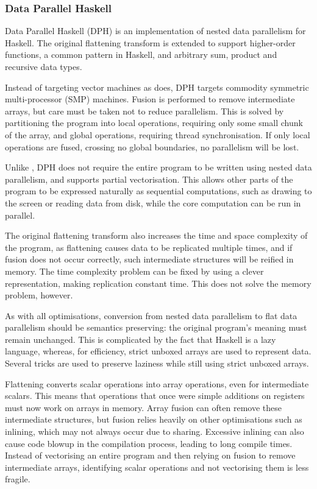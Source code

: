 \subsubsection{Data Parallel Haskell}
Data Parallel Haskell (DPH) is an implementation of nested data parallelism for Haskell\cite{chakravarty2007data}.
The original flattening transform is extended to support higher-order functions\cite{leshchinskiy2006higher}, a common pattern in Haskell,
and arbitrary sum, product and recursive data types\cite{chakravarty2000more}.

Instead of targeting vector machines as \nesl does, DPH targets commodity symmetric multi-processor (SMP) machines.
Fusion is performed to remove intermediate arrays, but care must be taken not to reduce parallelism\cite{chakravarty1999portable}.
This is solved by partitioning the program into local operations, requiring only some small chunk of the array,
and global operations, requiring thread synchronisation\cite{keller1999distributed}.
If only local operations are fused, crossing no global boundaries, no parallelism will be lost.

Unlike \nesl, DPH does not require the entire program to be written using nested data parallelism,
and supports partial vectorisation\cite{chakravarty2008partial}.
This allows other parts of the program to be expressed naturally as sequential computations, such as drawing to the screen or reading data from disk,
while the core computation can be run in parallel.

The original flattening transform also increases the time and space complexity of the program,
as flattening causes data to be replicated multiple times,
and if fusion does not occur correctly, such intermediate structures will be reified in memory.
The time complexity problem can be fixed by using a clever representation, making replication constant time\cite{lippmeier2012work}.
This does not solve the memory problem, however.

As with all optimisations, conversion from nested data parallelism to flat data parallelism should be semantics preserving:
the original program's meaning must remain unchanged\cite{leshchinskiy2005higher}.
This is complicated by the fact that Haskell is a lazy language, whereas, for efficiency, strict unboxed arrays are used to represent data.
Several tricks are used to preserve laziness while still using strict unboxed arrays.

Flattening converts scalar operations into array operations, even for intermediate scalars\cite{keller2012vectorisation}.
This means that operations that once were simple additions on registers must now work on arrays in memory.
Array fusion can often remove these intermediate structures, but fusion relies heavily on other optimisations such as inlining,
which may not always occur due to sharing. Excessive inlining can also cause code blowup in the compilation process,
leading to long compile times.
Instead of vectorising an entire program and then relying on fusion to remove intermediate arrays,
identifying scalar operations and not vectorising them is less fragile.




